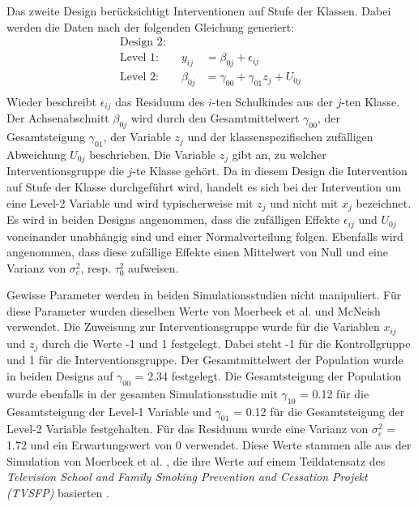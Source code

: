 \documentclass[12pt, a4paper]{article}\usepackage[]{graphicx}\usepackage[]{color}
\begin{document}
Das zweite Design berücksichtigt Interventionen auf Stufe der Klassen. Dabei werden die Daten nach der folgenden Gleichung generiert:
\begin{equation} 
\begin{split}
 \text{Design 2:}\\
  \text{Level 1:}  \qquad y_{ij} & = \beta_{0j} + \epsilon_{ij}\\
 \text{Level 2:} \qquad \beta_{0j} & = \gamma_{00} + \gamma_{01}z_{j} + U_{0j}\\
\end{split}	
\end{equation} 
Wieder beschreibt $\epsilon_{ij}$ das Residuum des $i$-ten Schulkindes aus der $j$-ten Klasse. Der Achsenabschnitt $\beta_{0j}$ wird durch den Gesamtmittelwert $\gamma_{00}$, der Gesamtsteigung $\gamma_{01}$, der Variable $z_{j}$ und der klassenspezifischen zufälligen Abweichung $U_{0j}$ beschrieben. Die Variable $z_{j}$ gibt an, zu welcher Interventionsgruppe die $j$-te Klasse gehört. Da in diesem Design die Intervention auf Stufe der Klasse durchgeführt wird, handelt es sich bei der Intervention um eine Level-2 Variable und wird typischerweise mit $z_{j}$ und nicht mit $x_{j}$ bezeichnet. Es wird in beiden Designs angenommen, dass die zufälligen Effekte $\epsilon_{ij}$ und $U_{0j}$ voneinander unabhängig sind und einer Normalverteilung folgen. Ebenfalls wird angenommen, dass diese zufällige Effekte einen Mittelwert von Null und eine Varianz von $\sigma^{2}_{e}$, resp. $\tau^{2}_{0}$ aufweisen.

Gewisse Parameter werden in beiden Simulationsstudien nicht manipuliert. Für diese Parameter wurden dieselben Werte von Moerbeek et al. \citeyearpar{MOERBEEK2003341} und McNeish \citeyearpar{mcneish2014analyzing} verwendet. Die Zuweisung zur Interventionsgruppe wurde für die Variablen $x_{ij}$ und $z_{j}$ durch die Werte -1 und 1 festgelegt. Dabei steht -1 für die Kontrollgruppe und 1 für die Interventionsgruppe. Der Gesamtmittelwert der Population wurde in beiden Designs auf $\gamma_{00}$ = 2.34 festgelegt. Die Gesamtsteigung der Population wurde ebenfalls in der gesamten Simulationsstudie mit $\gamma_{10}$ = 0.12 für die Gesamtsteigung der Level-1 Variable und $\gamma_{01}$ = 0.12 für die Gesamtsteigung der Level-2 Variable festgehalten. Für das Residuum wurde eine Varianz von $\sigma^{2}_{e}$ = 1.72 und ein Erwartungswert von 0 verwendet. Diese Werte stammen alle aus der Simulation von Moerbeek et al. \citeyearpar{MOERBEEK2003341}, die ihre Werte auf einem Teildatensatz des \textit{Television School and Family Smoking Prevention and Cessation Projekt (TVSFP)} basierten \citep{FLAY1995smoking}.
\end{document}
